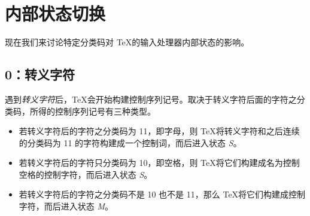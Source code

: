 \documentclass{book}
\begin{document}
\section{内部状态切换}

现在我们来讨论特定分类码对 \TeX 的输入处理器内部状态的影响。

\subsection{0：转义字符}

遇到\emph{转义字符}后，\TeX 会开始构建控制序列记号。取决于转义字符后面的字符之分类码，所得的控制序列记号有三种类型。

\begin{itemize}
\item 若转义字符后的字符之分类码为 11，即字母，则 \TeX 将转义字符和之后连续的分类码为 11 的字符构建成一个控制词，而后进入状态 {\itshape S}。
\item 若转义字符后的字符只分类码为 10，即空格，则 \TeX 将它们构建成名为控制空格的控制字符，而后进入状态 {\itshape S}。
\item 若转义字符后的字符之分类码不是 10 也不是 11，那么 \TeX 将它们构建成控制字符，而后进入状态 {\itshape M}。
\end{itemize}
\end{document}
